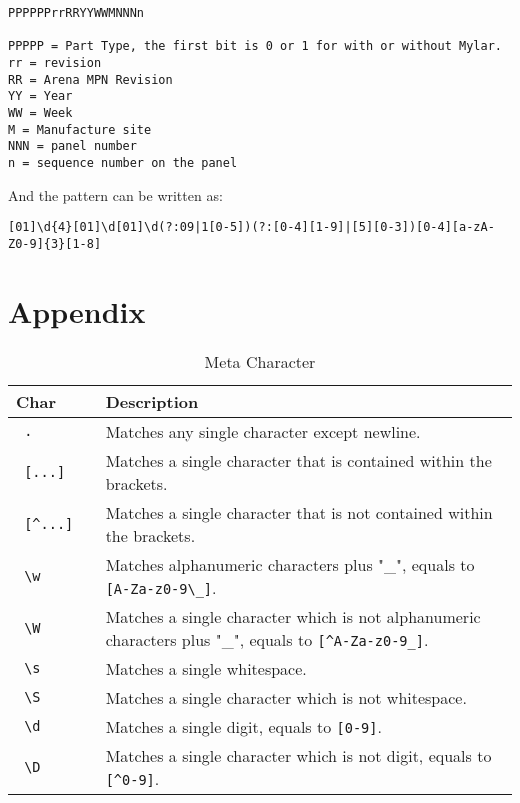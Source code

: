 \begin{lstlisting}
PPPPPPrrRRYYWWMNNNn

PPPPP = Part Type, the first bit is 0 or 1 for with or without Mylar.
rr = revision
RR = Arena MPN Revision
YY = Year
WW = Week
M = Manufacture site
NNN = panel number
n = sequence number on the panel
\end{lstlisting}

And the pattern can be written as:
\begin{lstlisting}
[01]\d{4}[01]\d[01]\d(?:09|1[0-5])(?:[0-4][1-9]|[5][0-3])[0-4][a-zA-Z0-9]{3}[1-8]
\end{lstlisting}

\section{Appendix}

\begin{table}[ht]
\caption{Meta Character}
\centering
\begin{tabular}{l p{8cm}}
\hline\hline
Char & Description \\[0.5ex]
\hline
\verb/ .          / & Matches any single character except newline. \\
\verb/ [...]/ & Matches a single character that is contained within the brackets.\\
\verb/ [^...]/ & Matches a single character that is not contained within the brackets.\\
\verb/ \w / & Matches alphanumeric characters plus "\_", equals to \verb/[A-Za-z0-9\_]/. \\
\verb/ \W / & Matches a single character which is not alphanumeric characters plus "\_", equals to \verb/[^A-Za-z0-9_]/. \\
\verb/ \s / & Matches a single whitespace. \\
\verb/ \S / & Matches a single character which is not whitespace. \\
\verb/ \d / & Matches a single digit, equals to \verb/[0-9]/.\\
\verb/ \D / & Matches a single character which is not digit, equals to \verb/[^0-9]/.\\
\hline
\end{tabular}
\label{table:mc}
\end{table}

